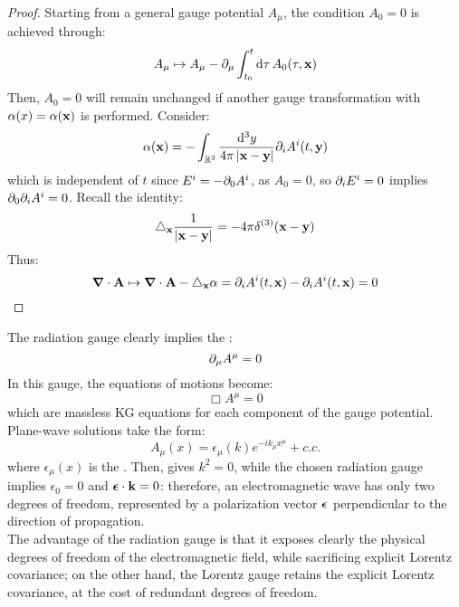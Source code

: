 \begin{proofbox}
  \begin{proof}
    Starting from a general gauge potential $ A_\mu $, the condition $ A_0 = 0 $ is achieved through:
    \begin{equation*}
      A_\mu \mapsto A_\mu - \partial_\mu \int_{t_0}^t \mathrm{d}\tau\, A_0(\tau,\mathbf{x})
    \end{equation*}
    Then, $ A_0 = 0 $ will remain unchanged if another gauge transformation with $ \alpha(x) = \alpha(\mathbf{x}) $ is performed. Consider:
    \begin{equation*}
      \alpha(\mathbf{x}) = - \int_{\mathbb{R}^3} \frac{\mathrm{d}^3y}{4\pi \left\lvert\mathbf{x} - \mathbf{y}\right\rvert} \partial_i A^i(t,\mathbf{y})
    \end{equation*}
    which is independent of $ t $ since $ E^i = -\partial_0 A^i $, as $ A_0 = 0 $, so $ \partial_i E^i = 0 $ implies $ \partial_0 \partial_i A^i = 0 $. Recall the identity:
    \begin{equation}
      \triangle_{\mathbf{x}} \frac{1}{\left\lvert\mathbf{x} - \mathbf{y}\right\rvert} = - 4\pi \delta^{(3)}(\mathbf{x} - \mathbf{y})
    \end{equation}
    Thus:
    \begin{equation*}
      \boldsymbol{\nabla} \cdot \mathbf{A} \mapsto \boldsymbol{\nabla} \cdot \mathbf{A} - \triangle_{\mathbf{x}} \alpha = \partial_i A^i(t,\mathbf{x}) - \partial_i A^i(t,\mathbf{x}) = 0
    \end{equation*}
  \end{proof}
\end{proofbox}

The radiation gauge clearly implies the :
\begin{equation}
  \partial_\mu A^\mu = 0
\end{equation}
In this gauge, the equations of motions  become:
\begin{equation}
  \Box A^\mu = 0
  \label{eq:maxw-lor}
\end{equation}
which are massless KG equations for each component of the gauge potential. Plane-wave solutions take the form:
\begin{equation}
  A_\mu(x) = \epsilon_\mu(k) e^{-i k_\mu x^\mu} + c.c.
\end{equation}
where $ \epsilon_\mu(x) $ is the . Then,  gives $ k^2 = 0 $, while the chosen radiation gauge implies $ \epsilon_0 = 0 $ and $ \boldsymbol{\epsilon} \cdot \mathbf{k} = 0 $: therefore, an electromagnetic wave has only two degrees of freedom, represented by a polarization vector $ \boldsymbol{\epsilon} $ perpendicular to the direction of propagation.\\
The advantage of the radiation gauge is that it exposes clearly the physical degrees of freedom of the electromagnetic field, while sacrificing explicit Lorentz covariance; on the other hand, the Lorentz gauge retains the explicit Lorentz covariance, at the cost of redundant degrees of freedom.

